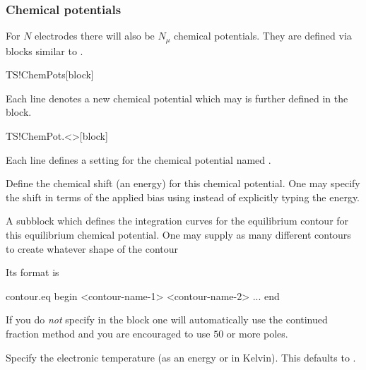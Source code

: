 \subsubsection{Chemical potentials}
\label{sec:ts:chem-pot}

For $N$ electrodes there will also be $N_\mu$ chemical
potentials. They are defined via blocks similar to .

\begin{fdfentry}{TS!ChemPots}[block]
  
  Each line denotes a new chemical potential which may is further
  defined in the  block.
  
\end{fdfentry}

\begin{fdfentry}{TS!ChemPot.<>}[block]

  Each line defines a setting for the chemical potential named
  \fdf*{<>}.


  \begin{fdfoptions}
    

    Define the chemical shift (an energy) for this chemical
    potential. One may specify the shift in terms of the applied bias
    using  instead of explicitly typing the energy.

    \option[contour.eq]%
    A subblock which defines the integration curves for the
    equilibrium contour for this equilibrium chemical potential. One
    may supply as many different contours to create whatever shape of
    the contour
    
    Its format is
    \begin{fdfexample}
      contour.eq
       begin
        <contour-name-1>
        <contour-name-2>
        ...
       end
    \end{fdfexample}

    \note If you do \emph{not} specify  in the block
    one will automatically use the continued fraction method and you
    are encouraged to use $50$ or more poles\cite{Ozaki2010}.


    Specify the electronic temperature (as an energy or in
    Kelvin). This defaults to .


\end{fdfoptions}
\end{fdfentry}
